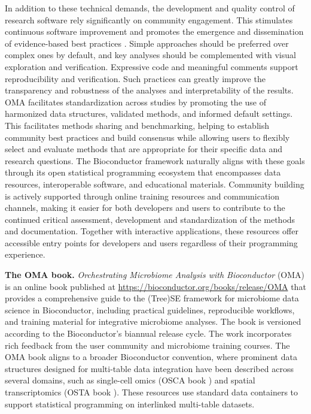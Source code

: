 \documentclass[
  sn-nature,
]{sn-jnl}
\begin{document}
In addition to these technical demands, the development and quality
control of research software rely significantly on community engagement.
This stimulates continuous software improvement and promotes the
emergence and dissemination of evidence-based best practices
\citep{berg2020, barker2022, hocquet2024}. Simple approaches should be
preferred over complex ones by default, and key analyses should be
complemented with visual exploration and verification. Expressive code
and meaningful comments support reproducibility and verification. Such
practices can greatly improve the transparency and robustness of the
analyses and interpretability of the results. OMA facilitates
standardization across studies by promoting the use of harmonized data
structures, validated methods, and informed default settings. This
facilitates methods sharing and benchmarking, helping to establish
community best practices and build consensus while allowing users to
flexibly select and evaluate methods that are appropriate for their
specific data and research questions. The Bioconductor framework
naturally aligns with these goals through its open statistical
programming ecosystem that encompasses data resources, interoperable
software, and educational materials. Community building is actively
supported through online training resources and communication channels,
making it easier for both developers and users to contribute to the
continued critical assessment, development and standardization of the
methods and documentation. Together with interactive applications, these
resources offer accessible entry points for developers and users
regardless of their programming experience.

\textbf{The OMA book.} \emph{Orchestrating Microbiome Analysis with
Bioconductor} (OMA) is an online book published at
\url{https://bioconductor.org/books/release/OMA} that provides a
comprehensive guide to the (Tree)SE framework for microbiome data
science in Bioconductor, including practical guidelines, reproducible
workflows, and training material for integrative microbiome analyses.
The book is versioned according to the Bioconductor's biannual release
cycle. The work incorporates rich feedback from the user community and
microbiome training courses. The OMA book aligns to a broader
Bioconductor convention, where prominent data structures
\citep{huber2015, ramos2017, huang2021} designed for multi-table data
integration have been described across several domains, such as
single-cell omics (OSCA book \citep{amezquita2020}) and spatial
transcriptomics (OSTA book \citep{crowell2025}). These resources use
standard data containers to support statistical programming on
interlinked multi-table datasets.
\end{document}
